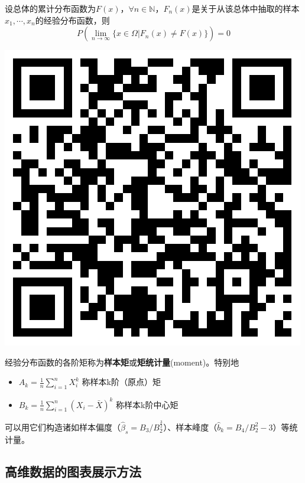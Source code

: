 \documentclass[UTF-8]{ctexbeamer}
\begin{document}
\begin{frame}
  \begin{Thm}
    设总体的累计分布函数为$F(x)$，$\forall n\in\mathbb{N}$，$F_n(x)$是关于从该总体中抽取的样本$x_1,\cdots,x_n$的经验分布函数，则
\[P(\lim\limits_{n\to\infty}\{x\in \Omega|F_n(x)\neq F(x)\})=0\]
\end{Thm}

\includegraphics[scale=0.3]{Glivenko-Cantelli.png}
\end{frame}

\begin{frame}
  经验分布函数的各阶矩称为\textbf{样本矩}或\textbf{矩统计量}(moment)。特别地
\begin{itemize}
\item$A_k=\frac{1}{n}\sum_{i=1}^nX_i^k$ 称样本k阶（原点）矩
  
\item$B_k=\frac{1}{n}\sum_{i=1}^n( X_i-\bar X)^k$ 称样本k阶中心矩
\end{itemize}

可以用它们构造诸如样本偏度（$\hat\beta_s=B_3/B_2^{\frac 3 2}$）、样本峰度（$\hat b_k=B_4/B_2^2-3$）等统计量。
\end{frame}

\subsection{高维数据的图表展示方法}
\end{document}
